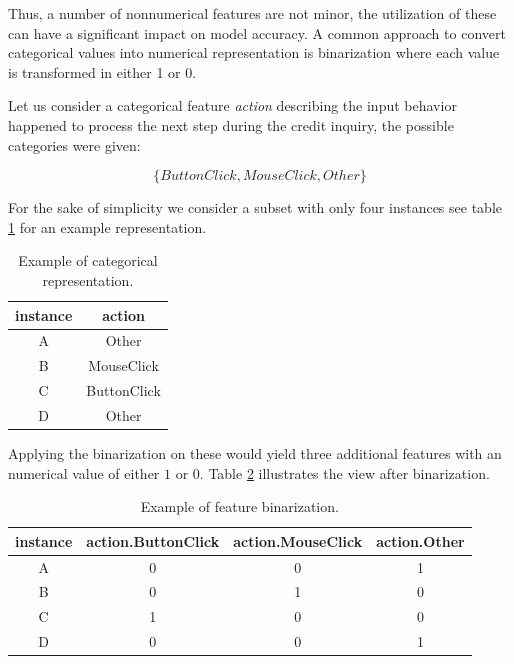 Thus, a number of nonnumerical features are not minor, the utilization of these can have a significant impact on model accuracy. A common approach to convert categorical values into numerical representation is binarization where each value is transformed in either 1 or 0.

Let us consider a categorical feature \textit{action} describing the input behavior happened to process the next step during the credit inquiry, the possible categories were given: 


\[ \{ButtonClick, MouseClick, Other\} \]

For the sake of simplicity we consider a subset with only four instances see table \ref{tab:feature-categorical-rep} for an example representation. 

\begin{table}[h!]
  \begin{center}
    \caption{Example of categorical representation.}
    \label{tab:feature-categorical-rep}
    \begin{tabular}{c|c}
    instance & action \\
      \hline
     A & Other \\ 
     \hline 
       B & MouseClick \\ 
     \hline
       C & ButtonClick \\ 
     \hline
       D & Other \\ 
     \hline
    \end{tabular}
  \end{center}
\end{table}

Applying the binarization on these would yield three additional features with an numerical value of either \(1\) or \(0\). Table \ref{tab:feature-binarization} illustrates the view after binarization.

\begin{table}[h!]
  \begin{center}
    \caption{Example of feature binarization.}
    \label{tab:feature-binarization}
    \begin{tabular}{c|c|c|c|}
    instance & action.ButtonClick & action.MouseClick & action.Other \\
      \hline
     A & 0 & 0 & 1 \\ 
     \hline 
       B & 0 & 1 & 0 \\ 
     \hline
       C & 1 & 0 & 0 \\ 
     \hline
       D & 0 & 0 & 1 \\ 
     \hline
    \end{tabular}
  \end{center}
\end{table}

